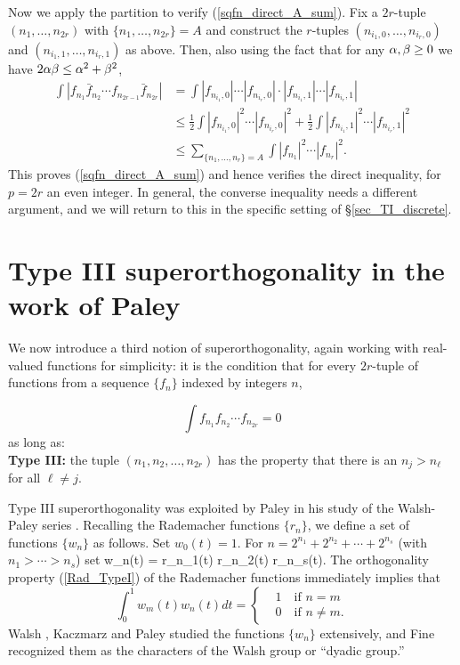 \documentclass[oneside,11pt]{amsart}
\begin{document}
Now we apply the partition to verify (\ref{sqfn_direct_A_sum}). 
Fix a $2r$-tuple $(n_1,\ldots, n_{2r})$ with $\{ n_1, \ldots, n_{2r} \} = A$ and construct the $r$-tuples $(n_{i_1,0}, \ldots, n_{i_r,0})$ and $(n_{i_1,1}, \ldots, n_{i_r,1})$ as above. Then, also using the fact that for any  $\alpha,\beta \geq 0$ we have $2\alpha \beta \leq \alpha^2 + \beta^2$,
\begin{align*}  \int | f_{n_1} \bar{f}_{n_2} \cdots f_{n_{2r-1}} \bar{f}_{n_{2r}}|  
	& = \int  |f_{n_{i_1},0}| \cdots |f_{n_{i_r},0}| \cdot   |f_{n_{i_1},1}| \cdots |f_{n_{i_r},1}| \\
	& \leq \frac{1}{2} \int  |f_{n_{i_1},0}|^2 \cdots |f_{n_{i_r},0}|^2  + \frac{1}{2} \int     |f_{n_{i_1},1}|^2 \cdots |f_{n_{i_r},1}|^2 \\
		& \leq  \sum_{ \{n_1, \ldots, n_{r}\} = A} \int  |f_{n_1}|^2 \cdots |f_{n_r}|^2  .
\end{align*}
This proves (\ref{sqfn_direct_A_sum}) and hence verifies the direct inequality, for $p=2r$ an even integer. 
In general, the converse inequality   needs a different argument, and we will return to this in the specific setting of \S \ref{sec_TI_discrete}.
 
 


\section{Type III  superorthogonality in the work of Paley}\label{sec_Paley}

We now introduce a third notion of superorthogonality, again working  with real-valued functions for simplicity: it is the condition that for  every $2r$-tuple of functions from  a sequence $\{f_n\}$ indexed by integers $n$,

\[  \int f_{n_1}f_{n_2} \cdots f_{n_{2r}}   =0 \]
as long as:\\
 {\bf Type III:}  the tuple $(n_1,n_2,\ldots, n_{2r})$ has the property that there is an $n_j>n_\ell$ for all $\ell \neq j$. 
 
 

 Type III  superorthogonality  was exploited by Paley in his study of the Walsh-Paley series \cite{Pal32}.
Recalling the Rademacher functions $\{r_n\}$, we define   a set of  functions $\{w_n\}$ as follows. Set   $w_0(t)=1$. For $n=2^{n_1} + 2^{n_2} + \cdots + 2^{n_s}$ (with $n_1> \cdots > n_s$) set 
\beq\label{psi_rad}
 w_n(t) = r_{n_1}(t) r_{n_2}(t) \cdots r_{n_s}(t).
 \eeq
The orthogonality property (\ref{Rad_TypeI}) of the Rademacher functions immediately  implies that
\[ 
\int_0^1 w_m(t) w_n(t) dt = \begin{cases} 
	&1 \quad \text{if $n =m$} \\
	& 0 \quad \text{if $n \neq m$.}
	\end{cases}
\]
  Walsh \cite{Wal21}, Kaczmarz \cite{Kac29} and Paley \cite{Pal32} studied the functions $\{w_n\}$ extensively, and Fine \cite[\S 2]{Fin49} recognized them as the characters of the Walsh group or ``dyadic group.''
   
\end{document}
